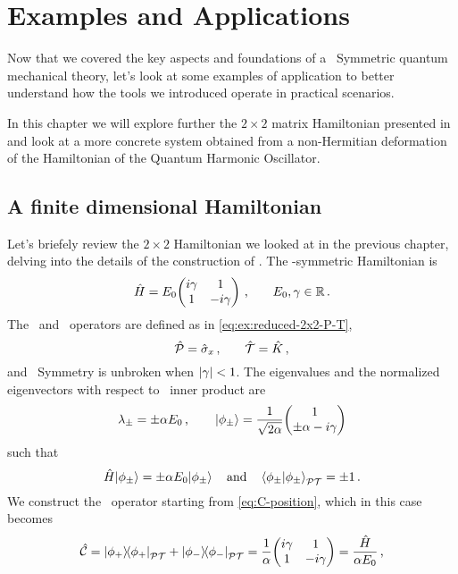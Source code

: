 \chapter{Examples and Applications}\label{ch:examples}
    Now that we covered the key aspects and foundations of a \PT\ Symmetric quantum mechanical theory, let's look at some examples of application to better understand how the tools we introduced operate in practical scenarios.
    
    In this chapter we will explore further the $2\times2$ matrix Hamiltonian presented in  and look at a more concrete system obtained from a non-Hermitian deformation of the Hamiltonian of the Quantum Harmonic Oscillator.
    \section{A finite dimensional Hamiltonian}
        Let's briefely review the $2\times2$ Hamiltonian we looked at in the previous chapter, delving into the details of the construction of \hC. The \PT-symmetric Hamiltonian is
        \begin{equation}
            \hH = E_0\! \pmqty{\dmat[1]{i\gamma, -i\gamma}}
            \mycomma \qquad
            E_0,\gamma \in \bbR
            \myperiod
        \end{equation}
        The \hP\ and \hT\ operators are defined as in \eqref{eq:ex:reduced-2x2-P-T},
        \begin{equation*}
            \mathcal{\hat{P}} = \hat{\sigma}_x \,\text{,} \qquad \mathcal{\hat{T}} = \hat{K}
            \,\text{,}
        \end{equation*}
        and \PT\ Symmetry is unbroken when $\abs{\gamma} < 1$. The eigenvalues and the normalized eigenvectors with respect to \PT\ inner product are
        \begin{equation*}
            \lambda_\pm = \pm \alpha E_0
            \mycomma
            \qquad
            \ket{\phi_\pm} = \frac{1}{\sqrt{2\alpha}} \!\pmqty{1 \\ \pm\alpha - i \gamma}
        \end{equation*}
        such that
        \begin{equation*}
            \hH \!\ket{\phi_\pm} = \pm \alpha E_0 \!\ket{\phi_\pm}
            \qand
            \braket{\phi_\pm}{\phi_\pm}_{\PT} = \pm 1
            \myperiod
        \end{equation*}
        We construct the \hC\ operator starting from \eqref{eq:C-position}, which in this case becomes
        \begin{equation}
            \hC = \dyad{\phi_+}{\phi_{+}}_{\PT} + \dyad{\phi_-}{\phi_-}_{\PT}
            = \frac{1}{\alpha} \!\pmqty{\dmat[1]{i\gamma, -i\gamma}}
            = \frac{\hH}{\alpha E_0}
            \mycomma
        \end{equation}
